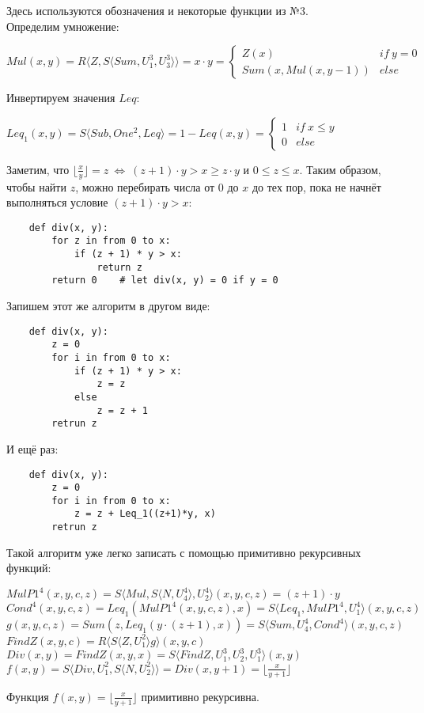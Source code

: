 \documentclass{article}
\begin{document}
	Здесь используются обозначения и некоторые функции из №3.\\
	Определим умножение:
	\begin{center}
		$Mul(x, y) = R\langle Z, S\langle Sum, U_1^3, U_3^3 \rangle \rangle = x\cdot y = \begin{cases}
		Z(x) & if \ y = 0 \\
		Sum(x, Mul(x, y-1)) & else
		\end{cases}$
	\end{center}
	Инвертируем значения $Leq$:
	\begin{center}
		$Leq_1(x, y) = S\langle Sub, One^2, Leq \rangle = 1 - Leq(x, y) = \begin{cases}
		1 & if \ x \leq y \\
		0 & else
		\end{cases}$
	\end{center}
	Заметим, что $\lfloor \frac{x}{y} \rfloor = z \ \iff \ (z + 1)\cdot y > x \geq z\cdot y$ и $0 \leq z \leq x$. Таким образом, чтобы найти $z$, можно перебирать числа от 0 до $x$ до тех пор, пока не начнёт выполняться условие $(z + 1)\cdot y > x$:
	\begin{lstlisting}
	def div(x, y):
	    for z in from 0 to x:
	        if (z + 1) * y > x:
	            return z
	    return 0	# let div(x, y) = 0 if y = 0
	\end{lstlisting}
	Запишем этот же алгоритм в другом виде:
	\begin{lstlisting}
	def div(x, y):
	    z = 0
	    for i in from 0 to x:
	        if (z + 1) * y > x:
	            z = z
	        else
	            z = z + 1
	    retrun z
	\end{lstlisting}
	И ещё раз:
	\begin{lstlisting}
	def div(x, y):
	    z = 0
	    for i in from 0 to x:
	        z = z + Leq_1((z+1)*y, x)
	    retrun z
	\end{lstlisting}
	Такой алгоритм уже легко записать с помощью примитивно рекурсивных функций:
	
	\begin{spacing}{1.4}
	\begin{center}
		$MulP1^4(x, y, c, z) = S\langle Mul, S\langle N, U_4^4 \rangle, U_2^4 \rangle(x, y, c, z) = (z + 1)\cdot y$\\
		$Cond^4(x, y, c, z) = Leq_1(MulP1^4(x, y, c, z), x) = S\langle Leq_1, MulP1^4, U_1^4 \rangle(x, y, c, z)$\\
		$g(x, y, c, z) = Sum(z, Leq_1(y\cdot(z+1), x)) = S\langle Sum, U_4^4, Cond^4 \rangle(x, y, c, z)$\\
		$FindZ(x, y, c) = R\langle S\langle Z, U_1^2 \rangle g \rangle(x, y, c)$ \\
		$Div(x, y) = FindZ(x, y, x) =  S\langle FindZ, U_1^3, U_2^3, U_1^3 \rangle(x, y)$\\
		$f(x, y) = S\langle Div, U_1^2, S\langle N, U_2^2 \rangle\rangle = Div(x, y + 1) = \lfloor \frac{x}{y+1} \rfloor$
	\end{center}
	\end{spacing}
	Функция $f(x, y) = \lfloor \frac{x}{y+1} \rfloor$ примитивно рекурсивна.
	
\end{document}
